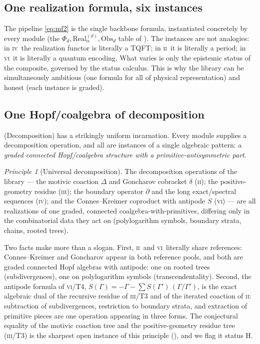 \documentclass[12pt]{article}
\theoremstyle{definition}
\theoremstyle{remark}
\newtheorem{principle}[theorem]{Principle}
\newcommand{\Real}{\mathrm{Real}}
\newcommand{\Obs}{\mathrm{Obs}}
\newcommand{\Hstat}{\textsf{H}}
\newcommand{\PII}{\textsc{ii}}
\newcommand{\PIII}{\textsc{iii}}
\newcommand{\PIV}{\textsc{iv}}
\newcommand{\PVI}{\textsc{vi}}
\begin{document}
\subsection{One realization formula, six instances}

The pipeline \eqref{eq:mf2} is the single backbone formula, instantiated concretely by
every module (the $\Phi_d,\Real^{(d)}_\alpha,\Obs_d$ table of ).
The instances are not analogies: in \PIV\ the realization functor is literally a TQFT;
in \PII\ it is literally a period; in \PVI\ it is literally a quantum encoding.  What
varies is only the epistemic status of the composite, governed by the status calculus.
This is why the library can be simultaneously ambitious (one formula for all of
physical representation) and honest (each instance is graded).

\subsection{One Hopf/coalgebra of decomposition}
\label{sec:onehopf}

 (Decomposition) has a strikingly uniform incarnation.  Every module
supplies a decomposition operation, and all are instances of a single algebraic
pattern: a \emph{graded connected Hopf/coalgebra structure with a primitive-antisymmetric
part}.

\begin{principle}[Universal decomposition]
\label{prin:dec}
The decomposition operations of the library --- the motivic coaction $\Delta$ and
Goncharov cobracket $\delta$ (\PII); the positive-geometry residue (\PIII); the
boundary operator $\partial$ and the long exact/spectral sequences (\PIV); and the
Connes--Kreimer coproduct with antipode $S$ (\PVI) --- are all realizations of one
graded, connected coalgebra-with-primitives, differing only in the combinatorial data
they act on (polylogarithm symbols, boundary strata, chains, rooted trees).
\end{principle}

Two facts make  more than a slogan.  First, \PII\ and \PVI\ literally
share references: Connes--Kreimer \cite{ConnesKreimer1999} and Goncharov
\cite{Goncharov2005} appear in both reference pools, and both are graded connected Hopf
algebras with antipode: one on rooted trees (subdivergences), one on polylogarithm
symbols (transcendentality).  Second, the antipode formula of \PVI/T4,
$S(\Gamma)=-\Gamma-\sum S(\Gamma')\,(\Gamma/\Gamma')$, is the exact algebraic dual of
the recursive residue of \PIII/T3 and of the iterated coaction of \PII: subtraction of
subdivergences, restriction to boundary strata, and extraction of primitive pieces are
one operation appearing in three forms.  The conjectural equality of the motivic coaction tree
and the positive-geometry residue tree (\PIII/T3) is the sharpest open instance of this
principle (), and we flag it status \Hstat.
\end{document}
